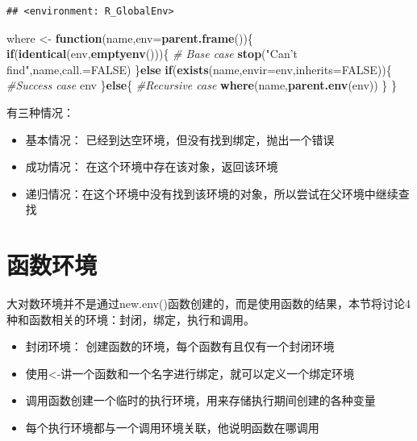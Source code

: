 \documentclass[]{book}
\newenvironment{Shaded}{\begin{snugshade}}{\end{snugshade}}
\newcommand{\KeywordTok}[1]{\textcolor[rgb]{0.13,0.29,0.53}{\textbf{#1}}}
\newcommand{\DataTypeTok}[1]{\textcolor[rgb]{0.13,0.29,0.53}{#1}}
\newcommand{\StringTok}[1]{\textcolor[rgb]{0.31,0.60,0.02}{#1}}
\newcommand{\CommentTok}[1]{\textcolor[rgb]{0.56,0.35,0.01}{\textit{#1}}}
\newcommand{\OtherTok}[1]{\textcolor[rgb]{0.56,0.35,0.01}{#1}}
\newcommand{\ControlFlowTok}[1]{\textcolor[rgb]{0.13,0.29,0.53}{\textbf{#1}}}
\newcommand{\NormalTok}[1]{#1}
\begin{document}
\begin{verbatim}
## <environment: R_GlobalEnv>
\end{verbatim}

\begin{Shaded}
\begin{Highlighting}[]
\NormalTok{where <-}\StringTok{ }\ControlFlowTok{function}\NormalTok{(name,}\DataTypeTok{env=}\KeywordTok{parent.frame}\NormalTok{())\{}
\ControlFlowTok{if}\NormalTok{(}\KeywordTok{identical}\NormalTok{(env,}\KeywordTok{emptyenv}\NormalTok{()))\{}
  \CommentTok{# Base case}
  \KeywordTok{stop}\NormalTok{(}\StringTok{"Can't find"}\NormalTok{,name,}\DataTypeTok{call.=}\OtherTok{FALSE}\NormalTok{)}
\NormalTok{\}}\ControlFlowTok{else} \ControlFlowTok{if}\NormalTok{(}\KeywordTok{exists}\NormalTok{(name,}\DataTypeTok{envir=}\NormalTok{env,}\DataTypeTok{inherits=}\OtherTok{FALSE}\NormalTok{))\{}
  \CommentTok{#Success case}
\NormalTok{  env}
\NormalTok{\}}\ControlFlowTok{else}\NormalTok{\{}
  \CommentTok{#Recursive case}
  \KeywordTok{where}\NormalTok{(name,}\KeywordTok{parent.env}\NormalTok{(env))}
\NormalTok{\}}
\NormalTok{\}}
\end{Highlighting}
\end{Shaded}

有三种情况：

\begin{itemize}
\item
  基本情况： 已经到达空环境，但没有找到绑定，抛出一个错误
\item
  成功情况： 在这个环境中存在该对象，返回该环境
\item
  递归情况：在这个环境中没有找到该环境的对象，所以尝试在父环境中继续查找
\end{itemize}

\section{函数环境}

大对数环境并不是通过new.env()函数创建的，而是使用函数的结果，本节将讨论4种和函数相关的环境：封闭，绑定，执行和调用。

\begin{itemize}
\item
  封闭环境： 创建函数的环境，每个函数有且仅有一个封闭环境
\item
  使用\textless{}-讲一个函数和一个名字进行绑定，就可以定义一个绑定环境
\item
  调用函数创建一个临时的执行环境，用来存储执行期间创建的各种变量
\item
  每个执行环境都与一个调用环境关联，他说明函数在哪调用
\end{itemize}
\end{document}
